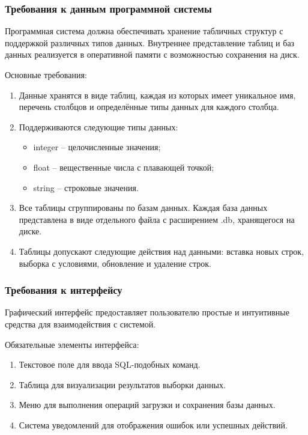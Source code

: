 \subsubsection{Требования к данным программной системы}

Программная система должна обеспечивать хранение табличных структур с поддержкой различных типов данных. Внутреннее представление таблиц и баз данных реализуется в оперативной памяти с возможностью сохранения на диск.

Основные требования:
\begin{enumerate}
	\item Данные хранятся в виде таблиц, каждая из которых имеет уникальное имя, перечень столбцов и определённые типы данных для каждого столбца.
	\item Поддерживаются следующие типы данных:
	\begin{itemize}
		\item integer -- целочисленные значения;
		\item float -- вещественные числа с плавающей точкой; 
		\item string -- строковые значения.
	\end{itemize}
	\item Все таблицы сгруппированы по базам данных. Каждая база данных представлена в виде отдельного файла с расширением .db, хранящегося на диске.
	\item Таблицы допускают следующие действия над данными: вставка новых строк, выборка с условиями, обновление и удаление строк.
\end{enumerate}

\subsubsection{Требования к интерфейсу}

Графический интерфейс предоставляет пользователю простые и интуитивные средства для взаимодействия с системой.

Обязательные элементы интерфейса:
\begin{enumerate}
	\item Текстовое поле для ввода SQL-подобных команд.		
	\item Таблица для визуализации результатов выборки данных.	
	\item Меню для выполнения операций загрузки и сохранения базы данных.	
	\item Система уведомлений для отображения ошибок или успешных действий.
\end{enumerate}


